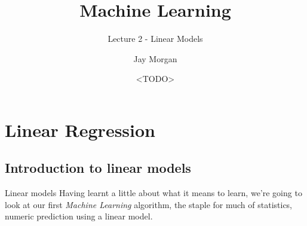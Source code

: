 \documentclass[10pt]{beamer}
\author{Jay Morgan}
\date{<TODO>}
\title{Machine Learning}
\subtitle{Lecture 2 - Linear Models}
\begin{document}
\maketitle

\section*{Linear Regression}
\label{sec:org3c1558c}

\subsection*{Introduction to linear models}
\label{sec:org19094bb}

\begin{frame}[label={sec:org3d6e2d8}]{Linear models}
Having learnt a little about what it means to learn, we're going to look at our first
\emph{Machine Learning} algorithm, the staple for much of statistics, numeric prediction
using a linear model.
\end{frame}
\end{document}
